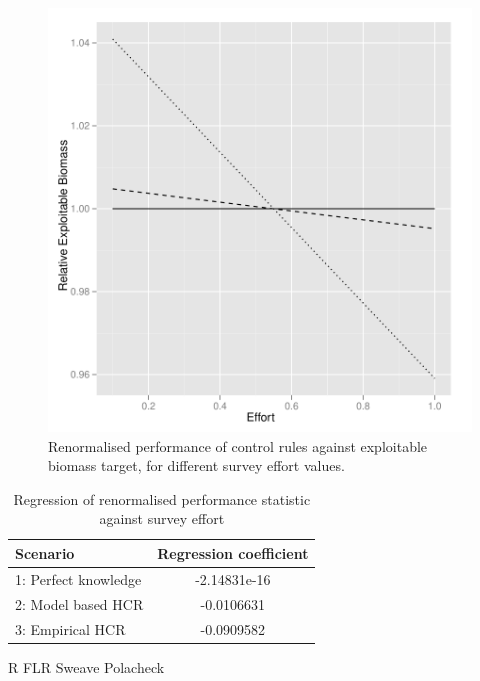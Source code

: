 \documentclass[a4paper]{article}
\begin{document}
\begin{figure}
\centering
\includegraphics{script-024}
\caption{Renormalised performance of control rules against exploitable biomass target, for different survey effort values.}
\label{fig:hcr_stoch_biomass_norm}
\end{figure}

\begin{table}
\centering
\begin{tabular}{lc}
\hline
Scenario & Regression coefficient\\
\hline
1: Perfect knowledge & -2.14831e-16\\
2: Model based HCR   & -0.0106631\\
3: Empirical HCR     & -0.0909582\\
\hline
\end{tabular}
\caption{Regression of renormalised performance statistic against survey effort}
\label{tab:res}
\end{table}



\newpage


R
FLR
Sweave
Polacheck
\end{document}
